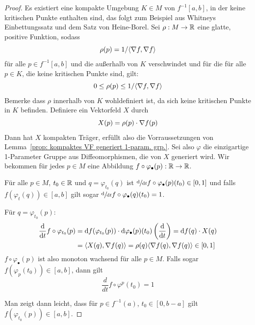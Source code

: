 \begin{proof}
    Es existiert eine kompakte Umgebung $K \in M$ von $f^{-1}[a, b]$, in der keine kritischen Punkte 
    enthalten sind, das folgt zum Beispiel aus Whitneys Einbettungssatz und dem Satz von Heine-Borel. 
    Sei $\rho: M \to { \mathbb R }$ eine glatte, positive Funktion, sodass
    \[ \rho(p) = 1 / \langle { \nabla } f, { \nabla } f \rangle \]
    für alle $p \in f^{-1}[a, b]$ und die außerhalb von $K$ verschwindet und für
    die für alle $p \in K$, die keine kritischen Punkte sind, gilt: 
    \[ 0 \leq \rho(p) \leq 1 / \langle { \nabla } f, { \nabla } f \rangle \]
    Bemerke dass $\rho$ innerhalb von $K$ wohldefiniert ist, da sich keine kritischen Punkte in $K$ 
    befinden. Definiere ein Vektorfeld $X$ durch
    \[ X(p) = \rho(p) \cdot { \nabla } f (p) \]
    Dann hat $X$ kompakten Träger, erfüllt also die Vorraussetzungen von 
    Lemma~\ref{prop: kompaktes VF generiert 1-param. grp.}. Sei also $\varphi$ die
    einzigartige 1-Parameter Gruppe aus Diffeomorphismen, die von $X$ generiert
    wird. 
    Wir bekommen für jedes $p \in M$ eine Abbildung 
    $f \circ \varphi_{\bullet}(p): { \mathbb R } \to { \mathbb R }$.
    
    \begin{claim*} 
        Für alle $p \in M$, $t_0 \in { \mathbb R }$ und $q = \varphi_{t_0}(q)$
        ist $\derive{t} f \circ \varphi_{\bullet}(p) (t_0) \in [0, 1]$ und falls 
        $f(\varphi_t(q)) \in [a, b]$ gilt sogar $\derive{t} f \circ \varphi_{\bullet}(q) (t_0) = 1$.
    \end{claim*}

    \begin{smallproof}
        Für $q = \varphi_{t_0}(p)$:
        \begin{align*}
            \derive{t} f \circ \varphi_{t_0}(p)
            & = \opd f (\varphi_{t_0}(p)) \cdot \opd \varphi_{\bullet}(p) (t_0) 
                \left( \derive{t} \right)
            = \opd f (q) \cdot X(q) \\
            & = \langle X(q), \grad f (q) \rangle 
            = \rho(q) \langle \grad f (q), \grad f (q) \rangle \in [0, 1]
        \end{align*}
        $f \circ \varphi_{\bullet}(p)$ ist also monoton wachsend für alle $p \in M$.
        Falls sogar $f(\varphi_p(t_0)) \in [a, b]$, dann gilt
        \[ \frac{d}{dt} f \circ \varphi^p (t_0) = 1 \]
    \end{smallproof}

    Man zeigt dann leicht, dass für $p \in f^{-1}(a)$, $t_0 \in [0, b-a]$ gilt 
    $f(\varphi_{t_0}(p)) \in [a, b]$.


\end{proof}
